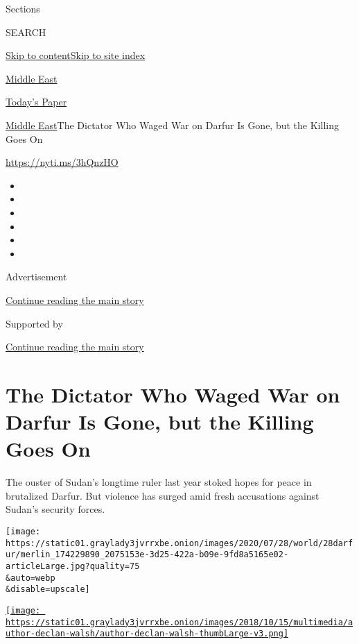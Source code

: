Sections

SEARCH

\protect\hyperlink{site-content}{Skip to
content}\protect\hyperlink{site-index}{Skip to site index}

\href{https://www.nytimes3xbfgragh.onion/section/world/middleeast}{Middle
East}

\href{https://myaccount.nytimes3xbfgragh.onion/auth/login?response_type=cookie\&client_id=vi}{}

\href{https://www.nytimes3xbfgragh.onion/section/todayspaper}{Today's
Paper}

\href{/section/world/middleeast}{Middle East}\textbar{}The Dictator Who
Waged War on Darfur Is Gone, but the Killing Goes On

\url{https://nyti.ms/3hQnzHO}

\begin{itemize}
\item
\item
\item
\item
\item
\item
\end{itemize}

Advertisement

\protect\hyperlink{after-top}{Continue reading the main story}

Supported by

\protect\hyperlink{after-sponsor}{Continue reading the main story}

\hypertarget{the-dictator-who-waged-war-on-darfur-is-gone-but-the-killing-goes-on}{%
\section{The Dictator Who Waged War on Darfur Is Gone, but the Killing
Goes
On}\label{the-dictator-who-waged-war-on-darfur-is-gone-but-the-killing-goes-on}}

The ouster of Sudan's longtime ruler last year stoked hopes for peace in
brutalized Darfur. But violence has surged amid fresh accusations
against Sudan's security forces.

\texttt{[image: https://static01.graylady3jvrrxbe.onion/images/2020/07/28/world/28darfur/merlin\_174229890\_2075153e-3d25-422a-b09e-9fd8a5165e02-articleLarge.jpg?quality=75\\\&auto=webp\\\&disable=upscale]}

\href{https://www.nytimes3xbfgragh.onion/by/declan-walsh}{\texttt{[image: https://static01.graylady3jvrrxbe.onion/images/2018/10/15/multimedia/author-declan-walsh/author-declan-walsh-thumbLarge-v3.png]}}

